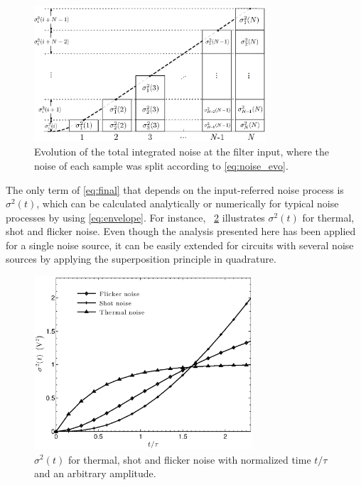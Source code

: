 \begin{figure}[!t]
	\centering
	\includegraphics[width=3.4in]{./Figures/envelope-example.eps}
	\caption{Evolution of the total integrated noise at the filter input, where the noise of each sample was split according to \eqref{eq:noise_evo}.}\label{fig:envelope-example}
\end{figure}

The only term of \eqref{eq:final} that depends on the input-referred noise process is $\sigma^2(t)$, which can be calculated analytically or numerically for typical noise processes by using \eqref{eq:envelope}. For instance, \figurename~\ref{fig:envelopes} illustrates $\sigma^2(t)$ for thermal, shot and flicker noise. Even though the analysis presented here has been applied for a single noise source, it can be easily extended for circuits with several noise sources by applying the superposition principle in quadrature. 

\begin{figure}[!t]
	\centering
	\includegraphics[width=3.2in]{./Figures/envelopes.eps}
	\caption{$\sigma^2(t)$ for thermal, shot and flicker noise with normalized time $t/\tau$ and an arbitrary amplitude.}\label{fig:envelopes}
\end{figure}

